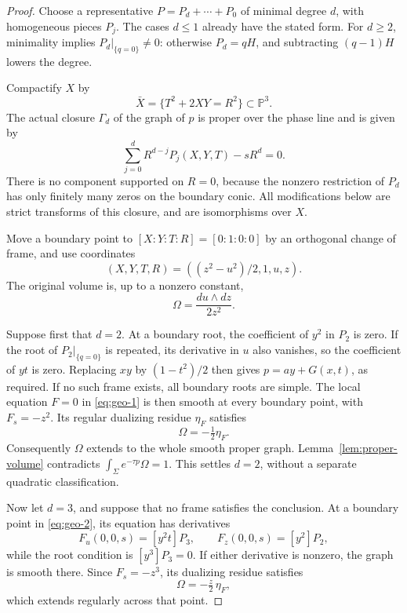 \begin{proof}
Choose a representative \(P=P_d+\cdots+P_0\) of minimal degree \(d\),
with homogeneous pieces \(P_j\). The cases \(d\leq1\) already have
the stated form. For \(d\geq2\), minimality implies
\(P_d|_{\{q=0\}}\neq0\): otherwise \(P_d=qH\), and subtracting
\((q-1)H\) lowers the degree.

Compactify \(X\) by
\[
 \bar X=\{T^2+2XY=R^2\}\subset\mathbb P^3.
\]
The actual closure \(\Gamma_d\) of the graph of \(p\) is proper over
the phase line and is given by
\begin{equation}\label{eq:geo-1}
\sum_{j=0}^d R^{d-j}P_j(X,Y,T)-sR^d=0.
\end{equation}
There is no component supported on \(R=0\), because the nonzero
restriction of \(P_d\) has only finitely many zeros on the boundary
conic. All modifications below are strict transforms of this
closure, and are isomorphisms over \(X\).

Move a boundary point to \([X:Y:T:R]=[0:1:0:0]\) by an orthogonal
change of frame, and use coordinates
\begin{equation}\label{eq:geo-2}
(X,Y,T,R)=((z^2-u^2)/2,1,u,z).
\end{equation}
The original volume is, up to a nonzero constant,
\begin{equation}\label{eq:geo-3}
\Omega=\frac{du\wedge dz}{2z^2}.
\end{equation}

Suppose first that \(d=2\).
At a boundary root, the coefficient of \(y^2\) in \(P_2\) is zero.
If the root of \(P_2|_{\{q=0\}}\) is repeated, its derivative in
\(u\) also vanishes, so the coefficient of \(yt\) is zero.
Replacing \(xy\) by \((1-t^2)/2\) then gives
\(p=ay+G(x,t)\), as required.
If no such frame exists, all boundary roots are simple.
The local equation \(F=0\) in \eqref{eq:geo-1} is then smooth at every boundary
point, with \(F_s=-z^2\). Its regular dualizing residue \(\eta_F\)
satisfies
\[
 \Omega=-\tfrac12\eta_F.
\]
Consequently \(\Omega\) extends to the whole smooth proper graph.
Lemma~\ref{lem:proper-volume} contradicts
\(\int_\Sigma e^{-\tau p}\Omega=1\).
This settles \(d=2\), without a separate quadratic classification.

Now let \(d=3\), and suppose that no frame satisfies the conclusion.
At a boundary point in \eqref{eq:geo-2}, its equation has derivatives
\[
 F_u(0,0,s)=[y^2t]P_3,\qquad
 F_z(0,0,s)=[y^2]P_2,
\]
while the root condition is \([y^3]P_3=0\).
If either derivative is nonzero, the graph is smooth there.
Since \(F_s=-z^3\), its dualizing residue satisfies
\begin{equation}\label{eq:geo-4}
\Omega=-\tfrac z2\,\eta_F,
\end{equation}
which extends regularly across that point.


\end{proof}
